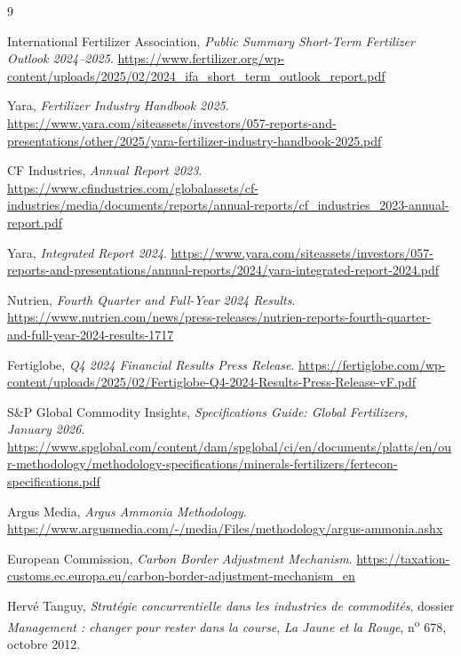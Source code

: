\documentclass[11pt]{article}
\begin{document}
\begin{thebibliography}{9}

International Fertilizer Association,
\emph{Public Summary Short-Term Fertilizer Outlook 2024--2025}.
\url{https://www.fertilizer.org/wp-content/uploads/2025/02/2024_ifa_short_term_outlook_report.pdf}

Yara,
\emph{Fertilizer Industry Handbook 2025}.
\url{https://www.yara.com/siteassets/investors/057-reports-and-presentations/other/2025/yara-fertilizer-industry-handbook-2025.pdf}

CF Industries,
\emph{Annual Report 2023}.
\url{https://www.cfindustries.com/globalassets/cf-industries/media/documents/reports/annual-reports/cf_industries_2023-annual-report.pdf}

Yara,
\emph{Integrated Report 2024}.
\url{https://www.yara.com/siteassets/investors/057-reports-and-presentations/annual-reports/2024/yara-integrated-report-2024.pdf}

Nutrien,
\emph{Fourth Quarter and Full-Year 2024 Results}.
\url{https://www.nutrien.com/news/press-releases/nutrien-reports-fourth-quarter-and-full-year-2024-results-1717}

Fertiglobe,
\emph{Q4 2024 Financial Results Press Release}.
\url{https://fertiglobe.com/wp-content/uploads/2025/02/Fertiglobe-Q4-2024-Results-Press-Release-vF.pdf}

S\&P Global Commodity Insights,
\emph{Specifications Guide: Global Fertilizers, January 2026}.
\url{https://www.spglobal.com/content/dam/spglobal/ci/en/documents/platts/en/our-methodology/methodology-specifications/minerals-fertilizers/fertecon-specifications.pdf}

Argus Media,
\emph{Argus Ammonia Methodology}.
\url{https://www.argusmedia.com/-/media/Files/methodology/argus-ammonia.ashx}

European Commission,
\emph{Carbon Border Adjustment Mechanism}.
\url{https://taxation-customs.ec.europa.eu/carbon-border-adjustment-mechanism_en}

Hervé Tanguy,
\emph{Stratégie concurrentielle dans les industries de commodités},
dossier \emph{Management : changer pour rester dans la course},
\emph{La Jaune et la Rouge}, n\textsuperscript{o} 678, octobre 2012.

\end{thebibliography}
\end{document}
